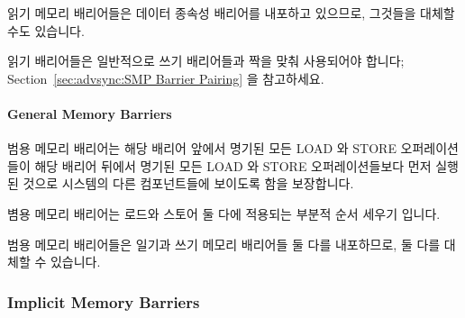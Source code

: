\begin{enumerate}
읽기 메모리 배리어들은 데이터 종속성 배리어를 내포하고 있으므로, 그것들을
대체할 수도 있습니다.

읽기 배리어들은 일반적으로 쓰기 배리어들과 짝을 맞춰 사용되어야
합니다; Section~\ref{sec:advsync:SMP Barrier Pairing} 을 참고하세요.

\paragraph{General Memory Barriers}

범용 메모리 배리어는 해당 배리어 앞에서 명기된 모든 LOAD 와 STORE
오퍼레이션들이 해당 배리어 뒤에서 명기된 모든 LOAD 와 STORE 오퍼레이션들보다
먼저 실행된 것으로 시스템의 다른 컴포넌트들에 보이도록 함을 보장합니다.

볌용 메모리 배리어는 로드와 스토어 둘 다에 적용되는 부분적 순서 세우기 입니다.

범용 메모리 배리어들은 일기과 쓰기 메모리 배리어들 둘 다를 내포하므로, 둘 다를
대체할 수 있습니다.

\subsubsection{Implicit Memory Barriers}


\end{enumerate}
